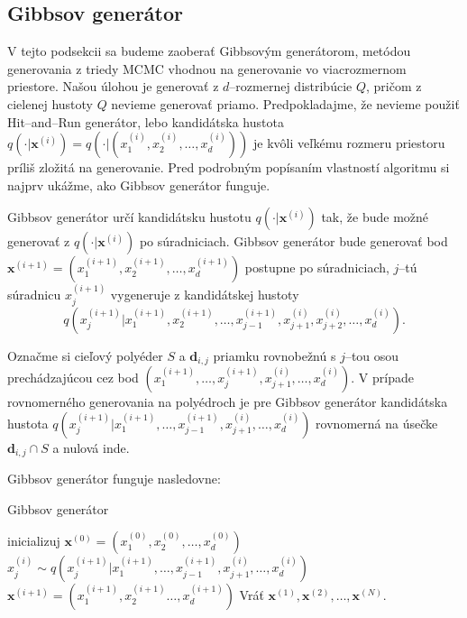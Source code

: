 \subsection{Gibbsov generátor}

V tejto podsekcii sa budeme zaoberať Gibbsovým generátorom, metódou generovania z triedy MCMC vhodnou na generovanie vo viacrozmernom priestore.
Našou úlohou je generovať z $d$--rozmernej distribúcie $Q$, pričom z cielenej hustoty $Q$ nevieme generovať priamo. Predpokladajme, že nevieme použiť Hit--and--Run generátor, lebo kandidátska hustota $q(\cdot| \mathbf x^{(i)})=q(\cdot|(x^{(i)}_1, x^{(i)}_2, \dots, x^{(i)}_d))$ je kvôli veľkému rozmeru priestoru príliš zložitá na generovanie. Pred podrobným popísaním vlastností algoritmu si najprv ukážme, ako Gibbsov generátor funguje.

Gibbsov generátor určí kandidátsku hustotu $q(\cdot|\mathbf x^{(i)})$ tak, že bude možné generovať z $q(\cdot|\mathbf x^{(i)})$ po súradniciach.
Gibbsov generátor bude generovať bod $\mathbf x^{(i+1)}=(x^{(i+1)}_1, x^{(i+1)}_2, \dots, x^{(i+1)}_d)$ postupne po súradniciach, $j$--tú súradnicu $x^{(i+1)}_j$ vygeneruje z kandidátskej hustoty $$q(x^{(i+1)}_j|x^{(i+1)}_1, x^{(i+1)}_2, \dots, x^{(i+1)}_{j-1}, x^{(i)}_{j+1}, x^{(i)}_{j+2}, \dots, x^{(i)}_d).$$

Označme si cieľový polyéder $S$ a $\mathbf d_{i,j}$ priamku rovnobežnú s $j$--tou osou prechádzajúcou cez bod $(x^{(i+1)}_1, \dots, x^{(i+1)}_{j}, x^{(i)}_{j+1}, \dots, x^{(i)}_d)$.
V prípade rovnomerného generovania na polyédroch je pre Gibbsov generátor kandidátska hustota $q(x^{(i+1)}_j|x^{(i+1)}_1, \dots, x^{(i+1)}_{j-1}, x^{(i)}_{j+1}, \dots, x^{(i)}_d)$ rovnomerná na úsečke $\mathbf d_{i,j} \cap S$ a nulová inde.

Gibbsov generátor funguje nasledovne:

\begin{algorithm}[H]
	\caption{Gibbsov generátor \cite{mcmc_intro_mackay}}
	\label{gibbs}
	\begin{algorithmic}[1]
		\State inicializuj $\mathbf x^{(0)} = (x^{(0)}_1, x^{(0)}_2, \dots, x^{(0)}_d)$
				\State $x^{(i)}_j \sim q(x^{(i+1)}_j|x^{(i+1)}_1, \dots, x^{(i+1)}_{j-1}, x^{(i)}_{j+1}, \dots, x^{(i)}_d)$
			\EndFor
			\State $\mathbf x^{(i+1)}= (x^{(i+1)}_1, x^{(i+1)}_2 \dots, x^{(i+1)}_d)$
		\EndFor
		\State Vráť ${\mathbf x^{(1)},\mathbf x^{(2)},\dots,\mathbf x^{(N)}}$.
	\end{algorithmic}
\end{algorithm}

